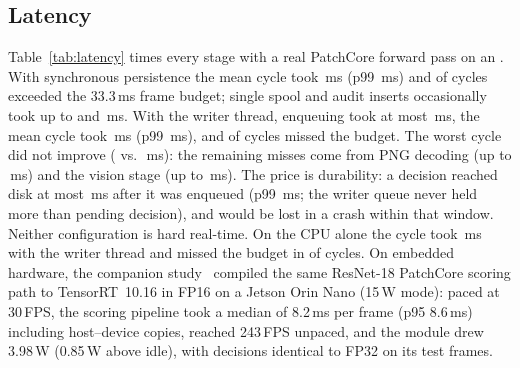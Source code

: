 \documentclass[conference]{IEEEtran}
\begin{document}
\subsection{Latency}
\begin{table}[!t]
\centering
\caption{Per-cycle latency on the inspection thread, paced at 30 frames/s (\LatCycles{} GPU and \LatCpuCycles{} CPU cycles per configuration; \LatNativeRes{} PNG frames; memory bank \MemoryBankSize{} patches). Synchronous: spool and audit inserts on the inspection thread. Writer thread: the inspection thread only enqueues the decision.}
\label{tab:latency}
\footnotesize\setlength{\tabcolsep}{4pt}

\end{table}
Table~\ref{tab:latency} times every stage with a real PatchCore forward pass on an \LatGpuName{}. With synchronous persistence the mean cycle took \LatGpuSyncMean{}\,ms (p99 \LatGpuSyncPNinetyNine{}\,ms) and \LatGpuSyncMiss{} of cycles exceeded the 33.3\,ms frame budget; single spool and audit inserts occasionally took up to \LatSpoolMax{} and \LatAuditMax{}\,ms. With the writer thread, enqueuing took at most \LatPersistMax{}\,ms, the mean cycle took \LatGpuAsyncMean{}\,ms (p99 \LatGpuAsyncPNinetyNine{}\,ms), and \LatGpuAsyncMiss{} of cycles missed the budget. The worst cycle did not improve (\LatGpuSyncMax{} vs.\ \LatGpuAsyncMax{}\,ms): the remaining misses come from PNG decoding (up to \LatDecodeMax{}\,ms) and the vision stage (up to \LatVisionMax{}\,ms). The price is durability: a decision reached disk at most \WriterLagMax{}\,ms after it was enqueued (p99 \WriterLagPNinetyNine{}\,ms; the writer queue never held more than \WriterMaxDepth{} pending decision), and would be lost in a crash within that window. Neither configuration is hard real-time. On the CPU alone the cycle took \LatCpuAsyncMean{}\,ms with the writer thread and missed the budget in \LatCpuAsyncMiss{} of cycles. On embedded hardware, the companion study~\cite{sengar2026paperB} compiled the same ResNet-18 PatchCore scoring path to TensorRT~10.16 in FP16 on a Jetson Orin Nano (15\,W mode): paced at 30\,FPS, the scoring pipeline took a median of 8.2\,ms per frame (p95 8.6\,ms) including host--device copies, reached 243\,FPS unpaced, and the module drew 3.98\,W (0.85\,W above idle), with decisions identical to FP32 on its test frames.
\end{document}
